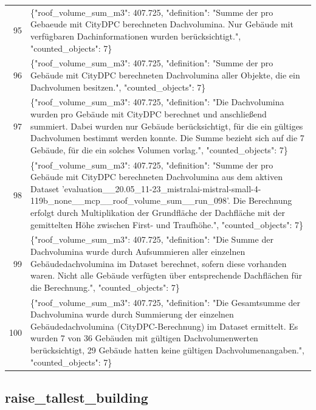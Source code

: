 \documentclass[a4paper,11pt]{article}
\begin{document}
\begin{table}[ht]
\begin{tabular}{r p{12cm}}
95 & \{"roof\_volume\_sum\_m3": 407.725, "definition": "Summe der pro Gebaeude mit CityDPC berechneten Dachvolumina. Nur Gebäude mit verfügbaren Dachinformationen wurden berücksichtigt.", "counted\_objects": 7\} \\
96 & \{"roof\_volume\_sum\_m3": 407.725, "definition": "Summe der pro Gebäude mit CityDPC berechneten Dachvolumina aller Objekte, die ein Dachvolumen besitzen.", "counted\_objects": 7\} \\
97 & \{"roof\_volume\_sum\_m3": 407.725, "definition": "Die Dachvolumina wurden pro Gebäude mit CityDPC berechnet und anschließend summiert. Dabei wurden nur Gebäude berücksichtigt, für die ein gültiges Dachvolumen bestimmt werden konnte. Die Summe bezieht sich auf die 7 Gebäude, für die ein solches Volumen vorlag.", "counted\_objects": 7\} \\
98 & \{"roof\_volume\_sum\_m3": 407.725, "definition": "Summe der pro Gebäude mit CityDPC berechneten Dachvolumina aus dem aktiven Dataset 'evaluation\_\_20.05\_11-23\_mistralai-mistral-small-4-119b\_none\_\_mcp\_\_roof\_volume\_sum\_\_run\_098'. Die Berechnung erfolgt durch Multiplikation der Grundfläche der Dachfläche mit der gemittelten Höhe zwischen First- und Traufhöhe.", "counted\_objects": 7\} \\
99 & \{"roof\_volume\_sum\_m3": 407.725, "definition": "Die Summe der Dachvolumina wurde durch Aufsummieren aller einzelnen Gebäudedachvolumina im Dataset berechnet, sofern diese vorhanden waren. Nicht alle Gebäude verfügten über entsprechende Dachflächen für die Berechnung.", "counted\_objects": 7\} \\
100 & \{"roof\_volume\_sum\_m3": 407.725, "definition": "Die Gesamtsumme der Dachvolumina wurde durch Summierung der einzelnen Gebäudedachvolumina (CityDPC-Berechnung) im Dataset ermittelt. Es wurden 7 von 36 Gebäuden mit gültigen Dachvolumenwerten berücksichtigt, 29 Gebäude hatten keine gültigen Dachvolumenangaben.", "counted\_objects": 7\} \\
\hline
\end{tabular}
\end{table}

\clearpage
\subsection{raise\_tallest\_building}
\end{document}
